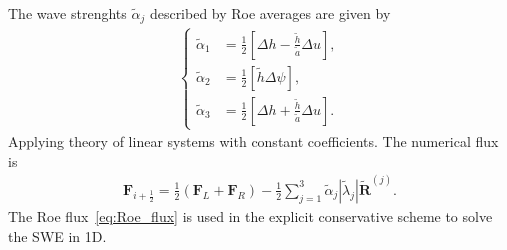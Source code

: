 The wave strenghts $\tilde{\alpha}_j$ described by Roe averages are given by
\begin{align}
    \left\{
    \begin{aligned}
        \tilde{\alpha}_1 &= \frac{1}{2} \left[ \Delta h - \frac{\tilde{h}}{\tilde{a}} \Delta u  \right], \\
        \tilde{\alpha}_2 &= \frac{1}{2} \left[ \tilde{h} \Delta \psi  \right], \\
        \tilde{\alpha}_3 &= \frac{1}{2} \left[ \Delta h + \frac{\tilde{h}}{\tilde{a}} \Delta u  \right].
    \end{aligned}    
    \right.
\end{align}
Applying theory of linear systems with constant coefficients.
The numerical flux is
\begin{align}\label{eq:Roe_flux}
    \mathbf{F}_{i+\frac{1}{2}} = \frac{1}{2} \left( \mathbf{F}_L + \mathbf{F}_R \right) - \frac{1}{2} \sum_{j=1}^3 \tilde{\alpha}_j \left| \tilde{\lambda}_j \right| \tilde{\mathbf{R}}^{(j)}.
\end{align}
The Roe flux~\eqref{eq:Roe_flux} is used in the explicit conservative scheme to solve the SWE in 1D.








